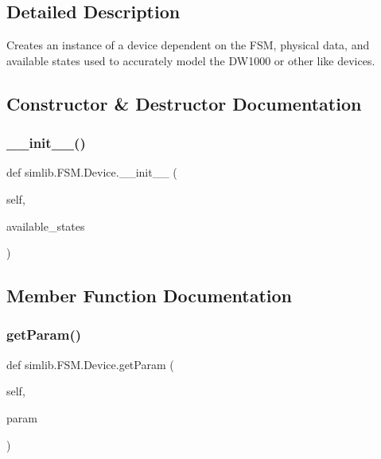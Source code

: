 \subsection{Detailed Description}
\begin{DoxyVerb}Creates an instance of a device dependent on the FSM,
physical data, and available states used to accurately
model the DW1000 or other like devices. 
\end{DoxyVerb}
 

\subsection{Constructor \& Destructor Documentation}
\mbox{\label{classsimlib_1_1_f_s_m_1_1_device_a306e757fa92528b888de0f1b00b0be5c}} 
\subsubsection{\texorpdfstring{\+\_\+\+\_\+init\+\_\+\+\_\+()}{\_\_init\_\_()}}
{\footnotesize\ttfamily def simlib.\+F\+S\+M.\+Device.\+\_\+\+\_\+init\+\_\+\+\_\+ (\begin{DoxyParamCaption}\item[{}]{self,  }\item[{}]{available\+\_\+states }\end{DoxyParamCaption})}



\subsection{Member Function Documentation}
\mbox{\label{classsimlib_1_1_f_s_m_1_1_device_a82fec7b5aa14a400069f9170640c8666}} 
\subsubsection{\texorpdfstring{get\+Param()}{getParam()}}
{\footnotesize\ttfamily def simlib.\+F\+S\+M.\+Device.\+get\+Param (\begin{DoxyParamCaption}\item[{}]{self,  }\item[{}]{param }\end{DoxyParamCaption})}

